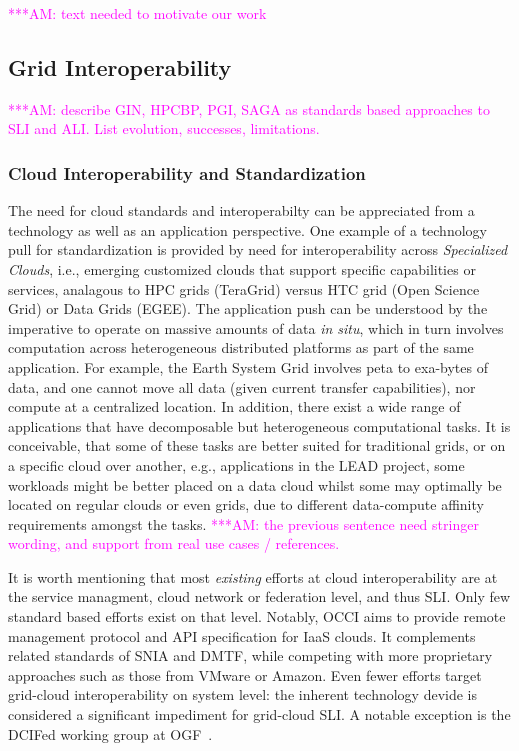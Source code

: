 \documentclass[10pt,conference,final,letterpaper,twoside,twocolumn,]{IEEEtran}
\newcommand{\amnote}[1]{  {\textcolor{magenta} {***AM: #1}}}
\newcommand{\amnote}[1]{}
\newcommand{\I}[1]{\textit{#1}}
\begin{document}
 \amnote{text needed to motivate our work}

 \subsection*{Grid Interoperability}

 \amnote{describe GIN, HPCBP, PGI, SAGA as standards based approaches
 to SLI and ALI.  List evolution, successes, limitations.}



 \subsubsection*{Cloud Interoperability and Standardization}

 The need for cloud standards and interoperabilty can be appreciated
 from a technology as well as an application perspective. One example
 of a technology pull for standardization is provided by need for
 interoperability across {\it Specialized Clouds}, i.e., emerging
 customized clouds that support specific capabilities or services,
 analagous to HPC grids (TeraGrid) versus HTC grid (Open Science Grid)
 or Data Grids (EGEE).  The application push can be understood by the
 imperative to operate on massive amounts of data {\it in situ}, which
 in turn involves computation across heterogeneous distributed
 platforms as part of the same application.  For example, the Earth
 System Grid involves peta to exa-bytes of data, and one cannot move
 all data (given current transfer capabilities), nor compute at a
 centralized location.  In addition, there exist a wide range of
 applications that have decomposable but heterogeneous computational
 tasks. It is conceivable, that some of these tasks are better suited
 for traditional grids, or on a specific cloud over another, e.g.,
 applications in the LEAD project, some workloads might be better
 placed on a data cloud whilst some may optimally be located on
 regular clouds or even grids, due to different data-compute affinity
 requirements amongst the tasks. \amnote{the previous sentence need
 stringer wording, and support from real use cases / references.}

 It is worth mentioning that most \I{existing} efforts at cloud
 interoperability are at the service managment, cloud network or
 federation level, and thus SLI.  Only few standard based efforts
 exist on that level.  Notably, OCCI aims to provide remote management
 protocol and API specification for IaaS clouds.  It complements
 related standards of SNIA and DMTF, while competing with more
 proprietary approaches such as those from VMware or Amazon.  Even
 fewer efforts target grid-cloud interoperability on system level: the
 inherent technology devide is considered a significant impediment for
 grid-cloud SLI.  A notable exception is the DCIFed working group at
 OGF~\cite{dcifed-www}.
 
\end{document}
